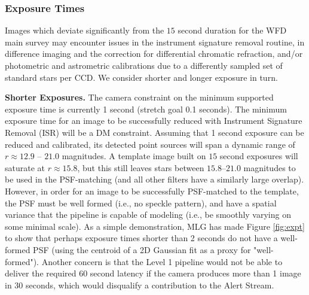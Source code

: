 \documentclass[DM,lsstdraft,toc]{lsstdoc}
\begin{document}
\subsubsection{Exposure Times}

Images which deviate significantly from the $15$ second duration for the WFD main survey may encounter issues in the instrument signature removal routine, in difference imaging and the correction for differential chromatic refraction, and/or photometric and astrometric calibrations due to a differently sampled set of standard stars per CCD. We consider shorter and longer exposure in turn.

{\bf Shorter Exposures.} The camera constraint on the minimum supported exposure time is currently 1 second (stretch goal 0.1 seconds). The minimum exposure time for an image to be successfully reduced with Instrument Signature Removal (ISR) will be a DM constraint. Assuming that 1 second exposure can be reduced and calibrated, its detected point sources will span a dynamic range of $r \approx 12.9$ -- $21.0$ magnitudes. A template image built on $15$ second exposures will saturate at $r \approx 15.8$, but this still leaves stars between $15.8$--$21.0$ magnitudes to be used in the PSF-matching (and all other filters have a similarly large overlap). However, in order for an image to be successfully PSF-matched to the template, the PSF must be well formed (i.e., no speckle pattern), and have a spatial variance that the pipeline is capable of modeling (i.e., be smoothly varying on some minimal scale). As a simple demonstration, MLG has made Figure \ref{fig:expt} to show that perhaps exposure times shorter than 2 seconds do not have a well-formed PSF (using the centroid of a 2D Gaussian fit as a proxy for "well-formed"). Another concern is that the Level 1 pipeline would not be able to deliver the required $60$ second latency if the camera produces more than 1 image in 30 seconds, which would disqualify a contribution to the Alert Stream.
\end{document}
